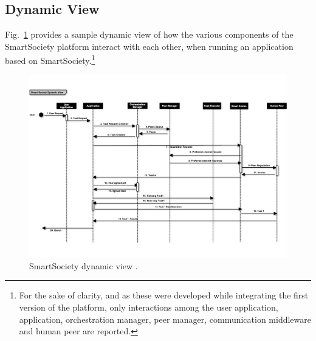 \subsection{Dynamic View}
Fig.~\ref{fig:dynamic_view} provides a sample dynamic view of how the various components of the SmartSociety platform interact with each other, when running an application based on SmartSociety.\footnote{For the sake of clarity, and as these were developed while integrating the first version of the platform, only interactions among the user application, application, orchestration manager, peer manager, communication middleware and human peer are reported.} 
\begin{figure}
 \centering
 \includegraphics[width=1\textwidth]{figs/dynamic_view.pdf}
 \caption{SmartSociety dynamic view .}
 \label{fig:dynamic_view}
\end{figure}


